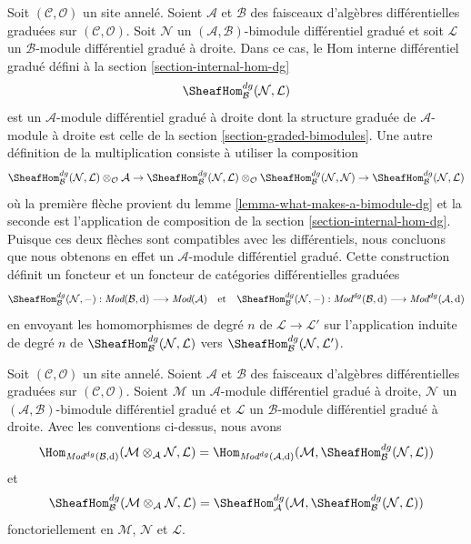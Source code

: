 \medskip\noindent
Soit $(\mathcal{C}, \mathcal{O})$ un site annelé.
Soient $\mathcal{A}$ et $\mathcal{B}$ des faisceaux d'algèbres différentielles graduées sur $(\mathcal{C}, \mathcal{O})$.
Soit $\mathcal{N}$ un $(\mathcal{A}, \mathcal{B})$-bimodule différentiel gradué et soit $\mathcal{L}$ un $\mathcal{B}$-module différentiel gradué à droite.
Dans ce cas, le Hom interne différentiel gradué défini à la section \ref{section-internal-hom-dg}
$$
\SheafHom_\mathcal{B}^{dg}(\mathcal{N}, \mathcal{L})
$$
est un $\mathcal{A}$-module différentiel gradué à droite dont la structure graduée de $\mathcal{A}$-module à droite est celle de la section \ref{section-graded-bimodules}.
Une autre définition de la multiplication consiste à utiliser la composition
$$
\SheafHom_\mathcal{B}^{dg}(\mathcal{N}, \mathcal{L})
\otimes_\mathcal{O} \mathcal{A}
\to
\SheafHom_\mathcal{B}^{dg}(\mathcal{N}, \mathcal{L})
\otimes_\mathcal{O} \SheafHom_\mathcal{B}^{dg}(\mathcal{N}, \mathcal{N})
\to
\SheafHom_\mathcal{B}^{dg}(\mathcal{N}, \mathcal{L})
$$
où la première flèche provient du lemme \ref{lemma-what-makes-a-bimodule-dg} et la seconde est l'application de composition de la section \ref{section-internal-hom-dg}.
Puisque ces deux flèches sont compatibles avec les différentiels, nous concluons que nous obtenons en effet un $\mathcal{A}$-module différentiel gradué.
Cette construction définit un foncteur et un foncteur de catégories différentielles graduées
$$
\SheafHom_\mathcal{B}^{dg}(\mathcal{N}, -) :
\textit{Mod}(\mathcal{B}, \text{d})
\longrightarrow
\textit{Mod}(\mathcal{A})
\quad\text{et}\quad
\SheafHom_\mathcal{B}^{dg}(\mathcal{N}, -) :
\textit{Mod}^{dg}(\mathcal{B}, \text{d})
\longrightarrow
\textit{Mod}^{dg}(\mathcal{A}, \text{d})
$$
en envoyant les homomorphismes de degré $n$ de $\mathcal{L} \to \mathcal{L}'$ sur l'application induite de degré $n$ de $\SheafHom_\mathcal{B}^{dg}(\mathcal{N}, \mathcal{L})$ vers $\SheafHom_\mathcal{B}^{dg}(\mathcal{N}, \mathcal{L}')$.

\begin{lemma}
\label{lemma-tensor-hom-adjunction-dg}
Soit $(\mathcal{C}, \mathcal{O})$ un site annelé.
Soient $\mathcal{A}$ et $\mathcal{B}$ des faisceaux d'algèbres différentielles graduées sur $(\mathcal{C}, \mathcal{O})$.
Soient $\mathcal{M}$ un $\mathcal{A}$-module différentiel gradué à droite, $\mathcal{N}$ un $(\mathcal{A}, \mathcal{B})$-bimodule différentiel gradué et $\mathcal{L}$ un $\mathcal{B}$-module différentiel gradué à droite.
Avec les conventions ci-dessus, nous avons
$$
\Hom_{\textit{Mod}^{dg}(\mathcal{B}, \text{d})}(
\mathcal{M} \otimes_\mathcal{A} \mathcal{N}, \mathcal{L}) =
\Hom_{\textit{Mod}^{dg}(\mathcal{A}, \text{d})}(
\mathcal{M}, \SheafHom_\mathcal{B}^{dg}(\mathcal{N}, \mathcal{L}))
$$
et
$$
\SheafHom_\mathcal{B}^{dg}(
\mathcal{M} \otimes_\mathcal{A} \mathcal{N}, \mathcal{L}) =
\SheafHom_\mathcal{A}^{dg}(
\mathcal{M}, \SheafHom_\mathcal{B}^{dg}(\mathcal{N}, \mathcal{L}))
$$
fonctoriellement en $\mathcal{M}$, $\mathcal{N}$ et $\mathcal{L}$.
\end{lemma}

